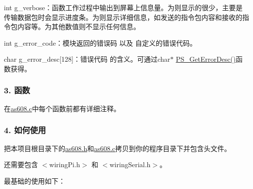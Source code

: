 \begin{DoxyItemize}
\item {\ttfamily int g\+\_\+verbose}：函数工作过程中输出到屏幕上信息量。为{}则显示的很少，主要是传输数据包时会显示进度条。为{}则显示详细信息，如发送的指令包内容和接收的指令包内容等。为{\ttfamily 其他}数值则不显示任何信息。
\item {\ttfamily int g\+\_\+error\+\_\+code}：模块返回的错误码 以及 自定义的错误代码。
\item {\ttfamily char g\+\_\+error\+\_\+desc\mbox{[}128\mbox{]}}：错误代码 的含义。可通过{\ttfamily char$\ast$ \hyperlink{as608_8c_af8cb71ea77ec9b32ca50d4732a6a7b67}{P\+S\+\_\+\+Get\+Error\+Desc()}}函数获得。
\end{DoxyItemize}

\subsubsection*{3. 函数}

在{\ttfamily \hyperlink{as608_8c}{as608.\+c}}中每个函数前都有详细注释。

\subsubsection*{4. 如何使用}

把本项目根目录下的{\ttfamily \hyperlink{as608_8h}{as608.\+h}}和{\ttfamily \hyperlink{as608_8c}{as608.\+c}}拷贝到你的程序目录下并包含头文件。

还需要包含 {\ttfamily $<$wiring\+Pi.\+h$>$} 和 {\ttfamily $<$wiring\+Serial.\+h$>$}。

最基础的使用如下：


